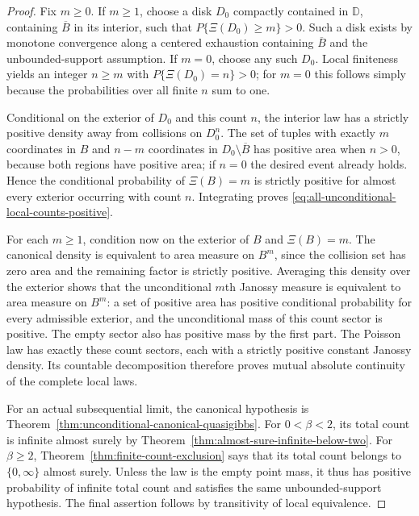 \documentclass[11pt,a4paper]{article}
\numberwithin{equation}{section}
\theoremstyle{definition}
\theoremstyle{remark}
\newcommand{\D}{\mathbb D}
\begin{document}
\begin{proof}
Fix $m\ge0$. If $m\ge1$, choose a disk $D_0$ compactly contained
in $\D$, containing $\overline B$ in its interior, such that
$P\{\Xi(D_0)\ge m\}>0$. Such a disk exists by monotone convergence
along a centered exhaustion containing $\overline B$ and the
unbounded-support assumption. If $m=0$, choose any such $D_0$.
Local finiteness yields an integer $n\ge m$ with
$P\{\Xi(D_0)=n\}>0$; for $m=0$ this follows simply because
the probabilities over all finite $n$ sum to one.

Conditional on the exterior of $D_0$ and this count $n$, the
interior law has a strictly positive density away from collisions
on $D_0^n$. The set of tuples with exactly $m$ coordinates in $B$
and $n-m$ coordinates in $D_0\setminus\overline B$ has positive
area when $n>0$, because both regions have positive area; if $n=0$
the desired event already holds. Hence the conditional probability
of $\Xi(B)=m$ is strictly positive for almost every exterior
occurring with count $n$. Integrating proves
\eqref{eq:all-unconditional-local-counts-positive}.

For each $m\ge1$, condition now on the exterior of $B$ and
$\Xi(B)=m$. The canonical density is equivalent to area measure
on $B^m$, since the collision set has zero area and the remaining
factor is strictly positive. Averaging this density over the
exterior shows that the unconditional $m$th Janossy measure is
equivalent to area measure on $B^m$: a set of positive area has
positive conditional probability for every admissible exterior,
and the unconditional mass of this count sector is positive.
The empty sector also has positive mass by the first part. The
Poisson law has exactly these count sectors, each with a strictly
positive constant Janossy density. Its countable decomposition
therefore proves mutual absolute continuity of the complete local
laws.

For an actual subsequential limit, the canonical hypothesis is
Theorem~\ref{thm:unconditional-canonical-quasigibbs}. For
$0<\beta<2$, its total count is infinite almost surely by
Theorem~\ref{thm:almost-sure-infinite-below-two}. For $\beta\ge2$,
Theorem~\ref{thm:finite-count-exclusion} says that its total count
belongs to $\{0,\infty\}$ almost surely. Unless the law is the
empty point mass, it thus has positive probability of infinite
total count and satisfies the same unbounded-support hypothesis.
The final assertion follows by transitivity of local equivalence.
\end{proof}
\end{document}

